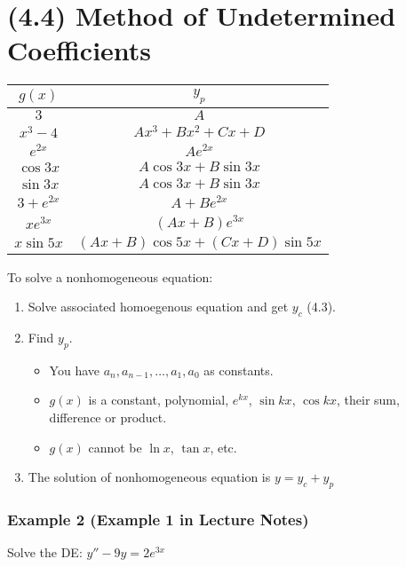 \documentclass{article}
\begin{document}
\newpage\section{(4.4) Method of Undetermined Coefficients}
\begin{center}
    \begin{tabular}{||c c||} 
     \hline
     $g(x)$ & $y_p$ \\ [0.5ex] 
     \hline\hline
     $3$ & $A$ \\ 
     \hline
     $x^3-4$ & $Ax^3+Bx^2+Cx+D$ \\
     \hline
     $e^{2x}$ & $Ae^{2x}$ \\
     \hline
     $\cos3x$ & $A\cos3x+B\sin3x$ \\
     \hline
     $\sin3x$ & $A\cos3x+B\sin3x$ \\
     \hline
     $3+e^{2x}$ & $A+Be^{2x}$ \\
     \hline
     $xe^{3x}$ & $(Ax+B)e^{3x}$ \\
     \hline
     $x\sin5x$ & $(Ax+B)\cos5x+(Cx+D)\sin5x$ \\ [1ex] 
     \hline
    \end{tabular}
\end{center}
To solve a nonhomogeneous equation: \begin{enumerate}
    \itemsep 0em
    \item Solve associated homoegenous equation and get $y_c$ (4.3).
    \item Find $y_p$. \begin{itemize}
        \itemsep 0em
        \item You have $a_n,a_{n-1},\dots,a_1,a_0$ as constants.
        \item $g(x)$ is a constant, polynomial, $e^{kx}$, $\sin{kx}$, $\cos{kx}$, their sum, difference or product.
        \item $g(x)$ cannot be $\ln{x}$, $\tan{x}$, etc.
    \end{itemize}
    \item The solution of nonhomogeneous equation is $y=y_c+y_p$
\end{enumerate}

\subsubsection{Example 2 (Example 1 in Lecture Notes)}
Solve the DE: $y''-9y=2e^{3x}$
\end{document}
